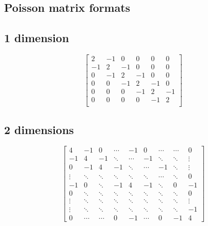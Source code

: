 


\clearpage
\subsection{Poisson matrix formats} %
\label{sec:poisson_matrix_format}

\subsection{1 dimension} %
\label{sub:1_dimension}

\[
  \begin{bmatrix}
    2 & -1 & 0 & 0 & 0 & 0 \\
    -1 & 2 & -1 & 0 & 0 & 0 \\
    0 & -1 & 2 & -1 & 0 & 0 \\
    0 & 0 & -1 & 2 & -1 & 0 \\
    0 & 0 & 0 & -1 & 2 & -1 \\
    0 & 0 & 0 & 0 & -1 & 2 \\
  \end{bmatrix}
\]

\subsection{2 dimensions} %
\label{sub:2_dimensions}

\[
  \begin{bmatrix}
    4 & -1 & 0 & \cdots & -1 & 0 & \cdots & \cdots & 0\\
    -1 & 4 & -1 & \ddots & \cdots & -1 & \ddots & \ddots & \vdots\\
    0 & -1 & 4 & -1 & \ddots & \cdots & -1 & \ddots & \vdots\\
    \vdots & \ddots & \ddots & \ddots & \ddots & \ddots & \cdots & \ddots & 0\\
    -1 & 0 & \ddots & -1 & 4 & -1 & \ddots & 0 & -1\\
    0 & \ddots & \ddots & \ddots & \ddots & \ddots & \ddots & \ddots & 0\\
    \vdots & \ddots & \ddots & \ddots & \ddots & \ddots & \ddots & \ddots & \vdots\\
    \vdots & \ddots & \ddots & \ddots & \ddots & \ddots & \ddots & \ddots & -1\\
    0 & \cdots & \cdots & 0 & -1 & \cdots & 0 & -1 & 4
  \end{bmatrix}
\]


